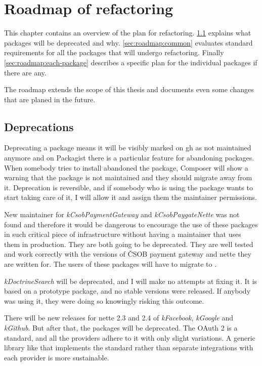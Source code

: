 \chapter{Roadmap of refactoring} \label{sec:roadmap}

This chapter contains an overview of the plan for refactoring. \ref{sec:roadmap:deprecations} explains what packages will be deprecated and why. \ref{sec:roadmap:common} evaluates standard requirements for all the packages that will undergo refactoring. Finally \ref{sec:roadmap:each-package} describes a specific plan for the individual packages if there are any.

The roadmap extends the scope of this thesis and documents even some changes that are planed in the future.

\section{Deprecations} \label{sec:roadmap:deprecations}

Deprecating a package means it will be visibly marked on \gls{gh} as not maintained anymore and on Packagist there is a particular feature for abandoning packages. When somebody tries to install abandoned the package, Composer will show a warning that the package is not maintained and they should migrate away from it. Deprecation is reversible, and if somebody who is using the package wants to start taking care of it, I will allow it and assign them the maintainer permissions.

New maintainer for \textit{\gls{kCsobPaymentGateway}} and \textit{\gls{kCsobPaygateNette}} was not found and therefore it would be dangerous to encourage the use of these packages in such critical piece of infrastructure without having a maintainer that uses them in production. They are both going to be deprecated. They are well tested and work correctly with the versions of ČSOB payment gateway and \gls{nette} they are written for. The users of these packages will have to migrate to .

\textit{\gls{kDoctrineSearch}} will be deprecated, and I will make no attempts at fixing it. It is based on a prototype package, and no stable versions were released. If anybody was using it, they were doing so knowingly risking this outcome.

There will be new releases for \gls{nette} 2.3 and 2.4 of \textit{\gls{kFacebook}}, \textit{\gls{kGoogle}} and \textit{\gls{kGithub}}. But after that, the packages will be deprecated. The OAuth 2 is a standard, and all the providers adhere to it with only slight variations. A generic library like  that implements the standard rather than separate integrations with each provider is more sustainable.

